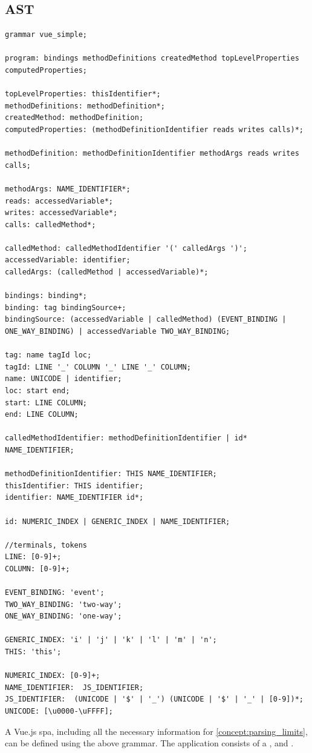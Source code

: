 \subsection{AST}
\label{ast}
\begin{lstlisting}[language=antrl,basicstyle=\fontsize{8}{8}\selectfont\ttfamily]
grammar vue_simple;

program: bindings methodDefinitions createdMethod topLevelProperties computedProperties;

topLevelProperties: thisIdentifier*;
methodDefinitions: methodDefinition*; 
createdMethod: methodDefinition;
computedProperties: (methodDefinitionIdentifier reads writes calls)*;

methodDefinition: methodDefinitionIdentifier methodArgs reads writes calls;

methodArgs: NAME_IDENTIFIER*;
reads: accessedVariable*;
writes: accessedVariable*;
calls: calledMethod*;

calledMethod: calledMethodIdentifier '(' calledArgs ')';
accessedVariable: identifier;
calledArgs: (calledMethod | accessedVariable)*;

bindings: binding*;
binding: tag bindingSource+;
bindingSource: (accessedVariable | calledMethod) (EVENT_BINDING | ONE_WAY_BINDING) | accessedVariable TWO_WAY_BINDING;

tag: name tagId loc;
tagId: LINE '_' COLUMN '_' LINE '_' COLUMN;
name: UNICODE | identifier;
loc: start end;
start: LINE COLUMN;
end: LINE COLUMN;

calledMethodIdentifier: methodDefinitionIdentifier | id* NAME_IDENTIFIER;

methodDefinitionIdentifier: THIS NAME_IDENTIFIER;
thisIdentifier: THIS identifier;
identifier: NAME_IDENTIFIER id*;

id: NUMERIC_INDEX | GENERIC_INDEX | NAME_IDENTIFIER;

//terminals, tokens
LINE: [0-9]+;
COLUMN: [0-9]+;

EVENT_BINDING: 'event';
TWO_WAY_BINDING: 'two-way';
ONE_WAY_BINDING: 'one-way';

GENERIC_INDEX: 'i' | 'j' | 'k' | 'l' | 'm' | 'n';
THIS: 'this';

NUMERIC_INDEX: [0-9]+;
NAME_IDENTIFIER:  JS_IDENTIFIER;
JS_IDENTIFIER:  (UNICODE | '$' | '_') (UNICODE | '$' | '_' | [0-9])*;
UNICODE: [\u0000-\uFFFF];
\end{lstlisting}


A Vue.js \gls{spa}, including all the necessary information for \ref{concept:parsing_limits}, can be defined using the above grammar. The application consists of   a ,  and . 

